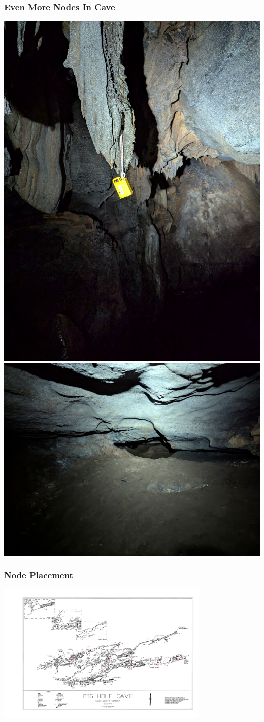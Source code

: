 \documentclass{beamer}
\begin{document}
\begin{frame}
\frametitle{Even More Nodes In Cave}

\begin{center}
\includegraphics[width=.47\textwidth]{../images/PXL_20250610_231822265.LONG_EXPOSURE-01.COVER.jpg}\hfill
\includegraphics[width=.47\textwidth]{../images/PXL_20250610_231836339.LONG_EXPOSURE.jpg}
\end{center}

\end{frame}

\begin{frame}
\frametitle{Node Placement}

\begin{center}
\includegraphics[width=4.0in]{../images/Pig Hole Cave-10Jun25-mesh.png}
\end{center}

\end{frame}
\end{document}
